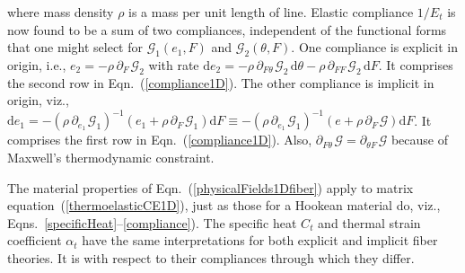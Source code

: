 where mass density $\rho$ is a mass per unit length of line.  Elastic compliance $1/E_t$ is now found to be a sum of two compliances, independent of the functional forms that one might select for $\mathcal{G}_1 ( e_1 , F )$ and $\mathcal{G}_2 ( \theta , F )$.  One compliance is explicit in origin, i.e., $e_2 = -\rho \, \partial_{F\,} \mathcal{G}_2$ with rate $\mathrm{d} e_2 = -\rho \, \partial_{F\theta\,} \mathcal{G}_2 \, \mathrm{d} \theta - \rho \, \partial_{FF\,} \mathcal{G}_2 \, \mathrm{d}F$.  It comprises the second row in Eqn.~(\ref{compliance1D}).  The other compliance is implicit in origin, viz., $\mathrm{d} e_1 = - ( \rho \, \partial_{e_1 \,} \mathcal{G}_1 )^{-1} ( e_1 + \rho \, \partial_{F\,} \mathcal{G}_1 ) \mathrm{d}F \equiv - ( \rho \, \partial_{e_1 \,} \mathcal{G}_1 )^{-1} ( e + \rho \, \partial_{F\,} \mathcal{G} ) \mathrm{d}F$.  It comprises the first row in Eqn.~(\ref{compliance1D}). Also, $\partial_{F\theta\,} \mathcal{G} = \partial_{\theta F\,} \mathcal{G}$ because of Maxwell's thermo\-dynamic constraint.

The material properties of Eqn.~(\ref{physicalFields1Dfiber}) apply to matrix equation~(\ref{thermoelasticCE1D}), just as those for a Hookean material do, viz., Eqns.~\ref{specificHeat}--\ref{compliance}).  The specific heat $C_t$ and thermal strain coefficient $\alpha_t$ have the same interpretations for both explicit and implicit fiber theories.  It is with respect to their compliances through which they differ.

